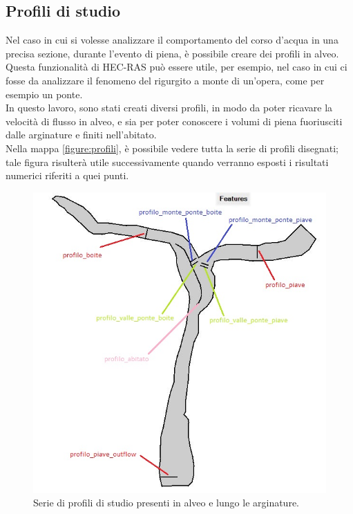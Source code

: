 \subsection{Profili di studio}
Nel caso in cui si volesse analizzare il comportamento del corso d'acqua in una precisa sezione, durante l'evento di piena, è possibile creare dei profili in alveo. Questa funzionalità di HEC-RAS può essere utile, per esempio, nel caso in cui ci fosse da analizzare il fenomeno del rigurgito a monte di un'opera, come per esempio un ponte.\\
In questo lavoro, sono stati creati diversi profili, in modo da poter ricavare la velocità di flusso in alveo, e sia per poter conoscere i volumi di piena fuoriusciti dalle arginature e finiti nell'abitato.\\
Nella mappa \eqref{figure:profili}, è possibile vedere tutta la serie di profili disegnati; tale figura risulterà utile successivamente quando verranno esposti i risultati numerici riferiti a quei punti.

\begin{figure}[htb] \centering
    \includegraphics[scale=0.7]{immagini/profili.JPG}
    \caption{Serie di profili di studio presenti in alveo e lungo le arginature.}
    \label{figure:profili}
\end{figure}

